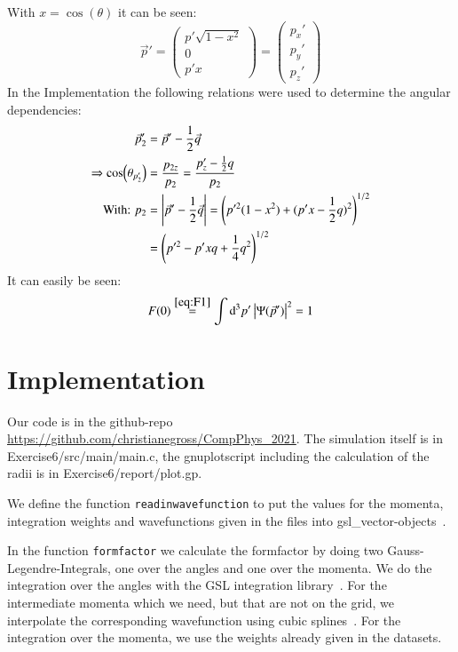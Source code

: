 \documentclass{scrartcl}
\begin{document}
With $x=\cos(\theta)$ it can be seen:
\begin{equation}
	\vec{p}'=\left(\begin{array}{c}
	p'\sqrt{1-x^2}\\
	0\\
	p'x
	\end{array}\right)=\left(\begin{array}{c}
	p_{x}'\\
	p_{y}'\\
	p_{z}'
	\end{array}\right)
\end{equation}
In the Implementation the following relations were used to determine the angular dependencies:
\begin{align}
	\vec{p}_2'&=\vec{p}'-\dfrac{1}{2}\vec{q}\\
	\Rightarrow \cos(\theta_{p_2'})&=\dfrac{p_{2z}}{p_2}=\dfrac{p_{z}'-\frac{1}{2}q}{p_2}\\
	\text{With: } p_2&=\abs{\vec{p}'-\frac{1}{2}\vec{q}}=\left(p'^2(1-x^2)+(p'x-\dfrac{1}{2}q)^2\right)^{1/2}\\
	&=\left(p'^2-p'x q +\dfrac{1}{4}q^2\right)^{1/2}
\end{align}
It can easily be seen:
\begin{equation}
	F(0)\overset{\ref{eq:F1}}{=}\int \dd[3]{p'}\abs{\Psi(\vec{p}')}^2=1
\end{equation}


\section{Implementation}

Our code is in the github-repo \url{https://github.com/christianegross/CompPhys\_2021}. The simulation itself is in Exercise6/src/main/main.c, the gnuplotscript including the calculation of the radii is in Exercise6/report/plot.gp. 

We define the function \texttt{readinwavefunction} to put the values for the momenta, integration weights and wavefunctions given in the files into gsl\_vector-objects~\cite{gsldoc_blk}. 

In the function \texttt{formfactor} we calculate the formfactor by doing two Gauss-Legendre-Integrals, one over the angles and one over the momenta. We do the integration over the angles with the GSL integration library~\cite{gsldoc_integrate}. For the intermediate momenta which we need, but that are not on the grid, we interpolate the corresponding wavefunction using cubic splines~\cite{gsldoc_interpolate}. For the integration over the momenta, we use the weights already given in the datasets.
\end{document}
